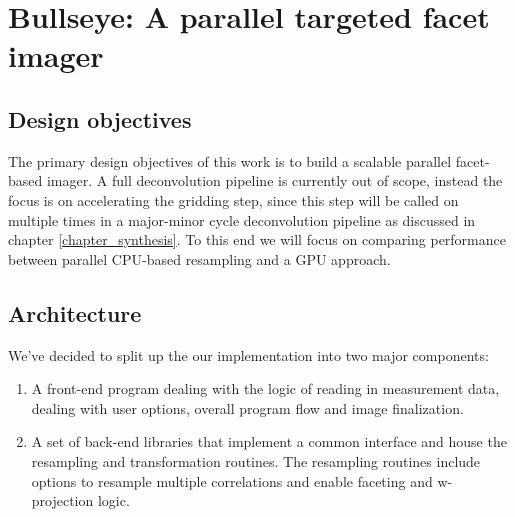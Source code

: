 \chapter{Bullseye: A parallel targeted facet imager}
\section{Design objectives}
The primary design objectives of this work is to build a scalable parallel facet-based imager. A full deconvolution pipeline is currently out of scope, instead 
the focus is on accelerating the gridding step, since this step will be called on multiple times in a major-minor cycle deconvolution pipeline as discussed in 
chapter \ref{chapter_synthesis}. To this end we will focus on comparing performance between parallel CPU-based resampling and a GPU approach.

\section{Architecture}
We've decided to split up the our implementation into two major components:
\begin{enumerate}
 \item A front-end program dealing with the logic of reading in measurement data, dealing with user options, overall program flow and image finalization.
 \item A set of back-end libraries that implement a common interface and house the resampling and transformation routines. The resampling routines include options to resample multiple
 correlations and enable faceting and w-projection logic.
\end{enumerate}

